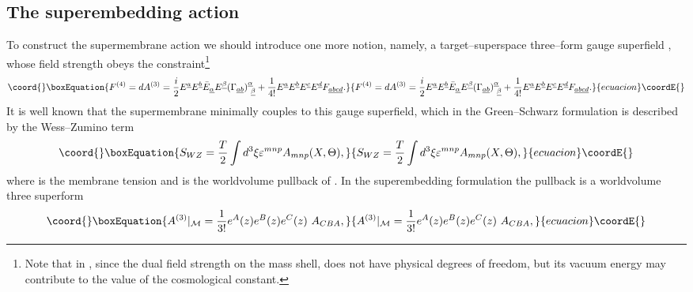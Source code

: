\documentclass[a4paper,12pt]{article}
\begin{document}
\subsection{The superembedding action}
To construct the supermembrane action we should introduce one
more notion, namely, a target--superspace three--form gauge
superfield \coordHE{}, whose field strength
obeys the constraint\footnote{Note that in \coordHE{}, since the dual
field strength
\coordHE{} on the mass shell, \coordHE{} does not have physical
degrees of freedom, but its vacuum energy may contribute to the
value of the cosmological constant.}
\begin{equation}\coord{}\boxEquation{\label{7}
F^{(4)}=dA^{(3)}={i\over 2}E^{\underline a}E^{\underline b}\bar
E_{\underline\alpha}E^{\underline\beta} (\Gamma_{\underline a
\underline b})^{\underline
\alpha}_
{~\underline\beta} +{1\over{4!}}E^{\underline a}E^{\underline b}
E^{\underline c}E^{\underline d} F_{\underline a\underline
b\underline c\underline d}.
}{F^{(4)}=dA^{(3)}={i\over 2}E^{\underline a}E^{\underline b}\bar
E_{\underline\alpha}E^{\underline\beta} (\Gamma_{\underline a
\underline b})^{\underline
\alpha}_
{~\underline\beta} +{1\over{4!}}E^{\underline a}E^{\underline b}
E^{\underline c}E^{\underline d} F_{\underline a\underline
b\underline c\underline d}.
}{ecuacion}\coordE{}\end{equation}
It is well known that the supermembrane minimally couples to this
gauge superfield, which in the Green--Schwarz formulation
\cite{bst1} is described by the Wess--Zumino term
\begin{equation}\coord{}\boxEquation{\label{wz}
S_{WZ}={T\over 2}\int d^3\xi \varepsilon^{mnp}A_{mnp}(X,\Theta),
}{S_{WZ}={T\over 2}\int d^3\xi \varepsilon^{mnp}A_{mnp}(X,\Theta),
}{ecuacion}\coordE{}\end{equation}
where \coordHE{} is the membrane tension and
\coordHE{}
is the worldvolume pullback of
\coordHE{}. In the superembedding formulation the \coordHE{}
pullback is a worldvolume three superform
\begin{equation}\coord{}\boxEquation{\label{a3pull}
A^{(3)}|_{\cal M}={1\over{3!}}e^A(z)e^B(z)e^C(z)~A_{CBA},
}{A^{(3)}|_{\cal M}={1\over{3!}}e^A(z)e^B(z)e^C(z)~A_{CBA},
}{ecuacion}\coordE{}\end{equation}
\end{document}
